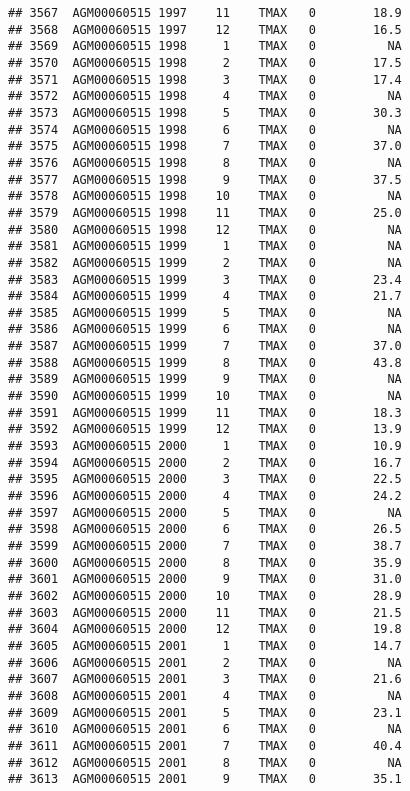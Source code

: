 \documentclass{article}\usepackage[]{graphicx}\usepackage[]{color}
\makeatletter
\newenvironment{kframe}{%
 \def\at@end@of@kframe{}%
 \ifinner\ifhmode%
  \def\at@end@of@kframe{\end{minipage}}%
  \begin{minipage}{\columnwidth}%
 \fi\fi%
 \def\FrameCommand##1{\hskip\@totalleftmargin \hskip-\fboxsep
 \colorbox{shadecolor}{##1}\hskip-\fboxsep
     \hskip-\linewidth \hskip-\@totalleftmargin \hskip\columnwidth}%
 \MakeFramed {\advance\hsize-\width
   \@totalleftmargin\z@ \linewidth\hsize
   \@setminipage}}%
 {\par\unskip\endMakeFramed%
 \at@end@of@kframe}
\newenvironment{knitrout}{}{} %
\makeatother
\begin{document}
\begin{knitrout}
\begin{kframe}
\begin{verbatim}
## 3567  AGM00060515 1997    11    TMAX   0        18.9
## 3568  AGM00060515 1997    12    TMAX   0        16.5
## 3569  AGM00060515 1998     1    TMAX   0          NA
## 3570  AGM00060515 1998     2    TMAX   0        17.5
## 3571  AGM00060515 1998     3    TMAX   0        17.4
## 3572  AGM00060515 1998     4    TMAX   0          NA
## 3573  AGM00060515 1998     5    TMAX   0        30.3
## 3574  AGM00060515 1998     6    TMAX   0          NA
## 3575  AGM00060515 1998     7    TMAX   0        37.0
## 3576  AGM00060515 1998     8    TMAX   0          NA
## 3577  AGM00060515 1998     9    TMAX   0        37.5
## 3578  AGM00060515 1998    10    TMAX   0          NA
## 3579  AGM00060515 1998    11    TMAX   0        25.0
## 3580  AGM00060515 1998    12    TMAX   0          NA
## 3581  AGM00060515 1999     1    TMAX   0          NA
## 3582  AGM00060515 1999     2    TMAX   0          NA
## 3583  AGM00060515 1999     3    TMAX   0        23.4
## 3584  AGM00060515 1999     4    TMAX   0        21.7
## 3585  AGM00060515 1999     5    TMAX   0          NA
## 3586  AGM00060515 1999     6    TMAX   0          NA
## 3587  AGM00060515 1999     7    TMAX   0        37.0
## 3588  AGM00060515 1999     8    TMAX   0        43.8
## 3589  AGM00060515 1999     9    TMAX   0          NA
## 3590  AGM00060515 1999    10    TMAX   0          NA
## 3591  AGM00060515 1999    11    TMAX   0        18.3
## 3592  AGM00060515 1999    12    TMAX   0        13.9
## 3593  AGM00060515 2000     1    TMAX   0        10.9
## 3594  AGM00060515 2000     2    TMAX   0        16.7
## 3595  AGM00060515 2000     3    TMAX   0        22.5
## 3596  AGM00060515 2000     4    TMAX   0        24.2
## 3597  AGM00060515 2000     5    TMAX   0          NA
## 3598  AGM00060515 2000     6    TMAX   0        26.5
## 3599  AGM00060515 2000     7    TMAX   0        38.7
## 3600  AGM00060515 2000     8    TMAX   0        35.9
## 3601  AGM00060515 2000     9    TMAX   0        31.0
## 3602  AGM00060515 2000    10    TMAX   0        28.9
## 3603  AGM00060515 2000    11    TMAX   0        21.5
## 3604  AGM00060515 2000    12    TMAX   0        19.8
## 3605  AGM00060515 2001     1    TMAX   0        14.7
## 3606  AGM00060515 2001     2    TMAX   0          NA
## 3607  AGM00060515 2001     3    TMAX   0        21.6
## 3608  AGM00060515 2001     4    TMAX   0          NA
## 3609  AGM00060515 2001     5    TMAX   0        23.1
## 3610  AGM00060515 2001     6    TMAX   0          NA
## 3611  AGM00060515 2001     7    TMAX   0        40.4
## 3612  AGM00060515 2001     8    TMAX   0          NA
## 3613  AGM00060515 2001     9    TMAX   0        35.1

\end{verbatim}
\end{kframe}
\end{knitrout}
\end{document}
